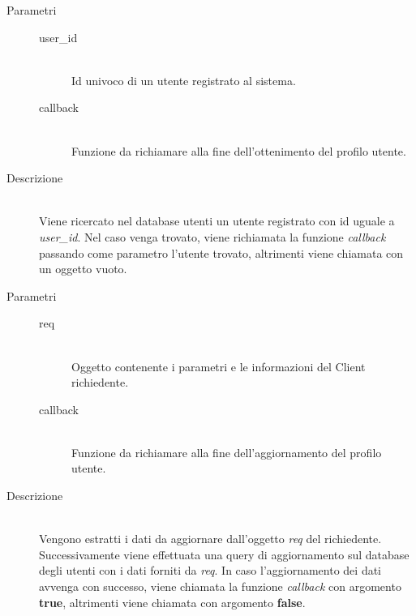 \begin{description}
\begin{mldescription}
 		 \hfill
 			\begin{description}
 				\item[Parametri] \hfill
 					\begin{description}
 						\item[user\_id] \hfill \\
 							Id univoco di un utente registrato al sistema.
 						\item[callback] \hfill \\
 							Funzione da richiamare alla fine dell'ottenimento del profilo utente.
 					\end{description}
 				\item[Descrizione] \hfill \\
 					Viene ricercato nel database utenti un utente registrato con id uguale a 	\textit{user\_id}. Nel caso venga trovato, viene richiamata la funzione \textit{callback}	passando come parametro l'utente trovato, altrimenti viene chiamata con un oggetto vuoto.
 			\end{description}
 			
 		 \hfill
 			\begin{description}
 				\item[Parametri] \hfill
 					\begin{description}
 						\item[req] \hfill \\
 							Oggetto contenente i parametri e le informazioni del Client richiedente.
 						\item[callback] \hfill \\
 							Funzione da richiamare alla fine dell'aggiornamento del profilo utente.
 					\end{description}
 				\item[Descrizione] \hfill \\
 					Vengono estratti i dati da aggiornare dall'oggetto \textit{req} del richiedente. Successivamente viene effettuata una query di aggiornamento sul database degli utenti con i dati forniti da \textit{req}. In caso l'aggiornamento dei dati avvenga con successo, 	viene chiamata la funzione \textit{callback} con argomento \textbf{true}, altrimenti 	viene chiamata con argomento \textbf{false}.  
 			\end{description}
 			

\end{mldescription}
\end{description}
